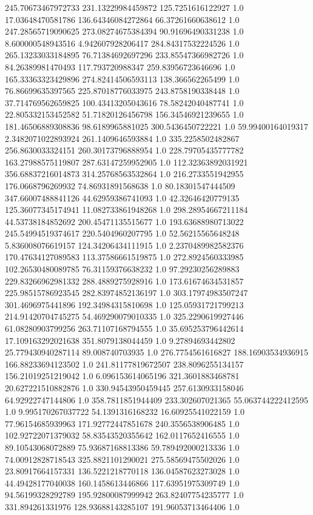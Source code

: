 245.70673467972733	231.13229984459872	125.7251616122927	1.0
17.03648470581786	136.64346084272864	66.37261660638612	1.0
247.28565719090625	273.08274675384394	90.91696490331238	1.0
8.600000548943516	4.942607928206417	284.84317532224526	1.0
265.13233033184895	76.71384692697296	233.85547366982726	1.0
84.26389981470493	117.793720988347	259.83956723646696	1.0
165.33363323429896	274.82414506593113	138.366562265499	1.0
76.86699635397565	225.87018776033975	243.8758190338448	1.0
37.714769562659825	100.43413205043616	78.58242040487741	1.0
22.805332153452582	51.71820126456798	156.34546921239655	1.0
181.46506889308836	98.6189965881025	300.5436450722221	1.0
59.99400164019317	2.3482071022893924	261.1409646593884	1.0
335.2258502482867	256.8630033324151	260.30173796888954	1.0
228.79705435777782	163.27988575119807	287.63147259952905	1.0
112.32363892031921	356.68837216014873	314.25768563532864	1.0
216.2733551942955	176.0668796269932	74.86931891568638	1.0
80.18301547444509	347.66007488841126	44.62959386741093	1.0
42.32646420779135	125.36077345174941	11.082733861948268	1.0
298.28954667211184	44.53738184852692	200.45471135515677	1.0
193.63688980713022	245.54994519374617	220.5404960207795	1.0
52.56215565648248	5.836008076619157	124.34206434111915	1.0
2.2370489982582376	170.47634127089583	113.37586661519875	1.0
272.8924560333985	102.26530480089785	76.31159376638232	1.0
97.29230256289883	229.83266962981332	288.4889275928916	1.0
173.61674634531857	225.98515786923545	282.83974852136197	1.0
303.17974983507247	301.4696975441896	192.34984315810698	1.0
125.05931721799213	214.91420704745275	54.469290079010335	1.0
325.2290619927446	61.08280903799256	263.71107168794555	1.0
35.695253796442614	17.109163292021638	351.8079138044459	1.0
9.27894693442802	25.779430940287114	89.008740703935	1.0
276.7754561616827	188.16903534936915	166.88233694123502	1.0
241.81177819672507	238.8096255134157	156.21019251219042	1.0
6.096153614065196	321.3601883468781	20.627221510882876	1.0
330.94543950459445	257.6130933158046	64.92922747144806	1.0
358.7811851944409	233.302607021365	55.063744222412595	1.0
9.995170267037722	54.1391316168232	16.60925541022159	1.0
77.96154685939963	171.92772447851678	240.3556538906485	1.0
102.92722071379032	58.83543520355642	162.0117652416555	1.0
89.10543068072889	75.93687168813386	59.789492000213336	1.0
74.00912828718543	325.8821101290021	275.58569475502026	1.0
23.80917664157331	136.5221218770118	136.04587623273028	1.0
44.49428177040038	160.1458613446866	117.63951975309749	1.0
94.56199328292789	195.92800087999942	263.82407754235777	1.0
331.894261331976	128.93688143285107	191.96053713464406	1.0

